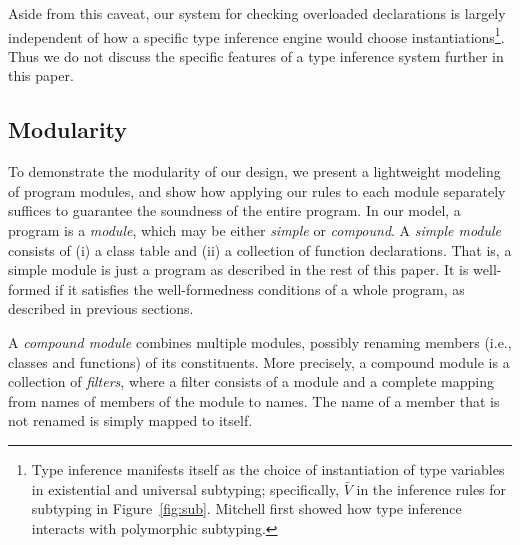 Aside from this caveat, our system for checking overloaded declarations 
is largely independent of how a specific type inference engine would choose 
instantiations\footnote{Type inference manifests itself as the choice of instantiation of type variables in existential and universal subtyping; specifically, $\bar{V}$ in the inference rules for subtyping in Figure~\ref{fig:sub}. Mitchell \cite{mitchell88} first showed how type inference interacts with polymorphic subtyping.}. Thus we do not discuss the specific features of a type inference
system further in this paper.


\subsection{Modularity}

To demonstrate the modularity of our design,
we present a lightweight modeling of program modules,
and show how applying our rules to each module separately
suffices to guarantee the soundness of the entire program.
In our model, 
a program is a \emph{module}, which may be either \emph{simple} or \emph{compound}.
A \emph{simple module} consists of 
(i) a class table and 
(ii) a collection of function declarations.
That is, a simple module is just a program as described in the rest of this paper.
It is well-formed if it satisfies the well-formedness conditions of a whole program,
as described in previous sections.

A \emph{compound module} combines multiple modules, 
possibly renaming members (i.e., classes and functions) of its constituents.
More precisely, a compound module is a collection of \emph{filters},
where a filter consists of a module 
and a complete mapping from names of members of the module to names.
The name of a member that is not renamed is simply mapped to itself.

